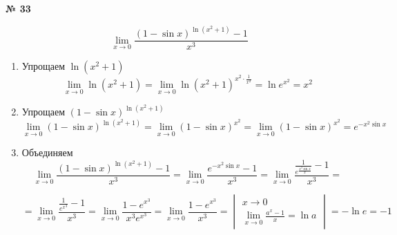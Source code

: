 \documentclass{article}
\begin{document}
\textbf{№ 33}
\Large

$$ \lim\limits_{x\to 0} \frac{(1-\sin{x})^{\ln{(x^2+1)}}-1}{x^3} $$

\begin{enumerate}
\item Упрощаем $\ln{(x^2+1)}$
$$ \lim\limits_{x\to 0} \ln{(x^2+1)} 
= \lim\limits_{x\to 0} \ln{(x^2+1)^{x^2 \cdot \frac{1}{x^2}}} 
= \ln{e^{x^2}}
= x^2 $$

\item Упрощаем $ (1-\sin{x})^{\ln{(x^2+1)}} $
$$ \lim\limits_{x\to 0} (1-\sin{x})^{\ln{(x^2+1)}} 
= \lim\limits_{x\to 0} (1-\sin{x})^{x^2} 
= \lim\limits_{x\to 0} (1-\sin{x})^{x^2} 
= e^{-x^2\sin{x}} $$

\item Объединяем
$$ \lim\limits_{x\to 0} \frac{(1-\sin{x})^{\ln{(x^2+1)}}-1}{x^3} 
= \lim\limits_{x\to 0} \frac{e^{-x^2\sin{x}}-1}{x^3} 
= \lim\limits_{x\to 0} \frac{\frac{1}{e^{\frac{x^3\sin{x}}{x}}}-1}{x^3} 
= $$

$$ = \lim\limits_{x\to 0} \frac{\frac{1}{e^{x^3}}-1}{x^3}
= \lim\limits_{x\to 0} \frac{1-e^{x^3}}{x^3e^{x^3}}
= \lim\limits_{x\to 0} \frac{1-e^{x^3}}{x^3}
= \begin{vmatrix} x \to 0 \\
                  \lim\limits_{x\to 0} \frac{a^x-1}{x} = \ln{a} \end{vmatrix}
= -\ln{e}
= -1 $$

\end{enumerate}
\end{document}

